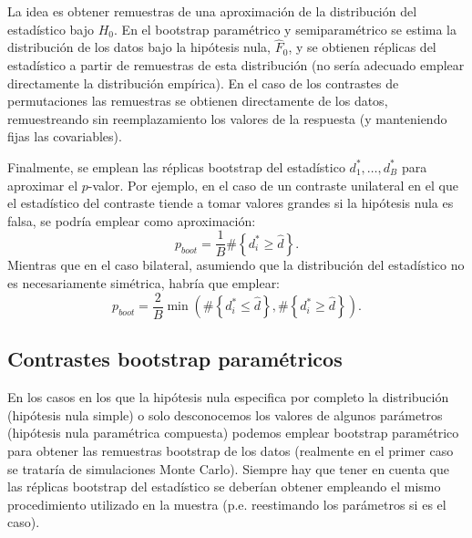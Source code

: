 \documentclass[
  spanish,
  10pt,
]{book}
\theoremstyle{break}
\theoremstyle{nonumberplain}
\begin{document}
La idea es obtener remuestras de una aproximación de la distribución del
estadístico bajo \(H_0\).
En el bootstrap paramétrico y semiparamétrico se estima la distribución
de los datos bajo la hipótesis nula, \(\hat{F}_0\), y se obtienen réplicas del
estadístico a partir de remuestras de esta distribución (no sería adecuado
emplear directamente la distribución empírica).
En el caso de los contrastes de permutaciones las remuestras se obtienen
directamente de los datos, remuestreando sin reemplazamiento los valores
de la respuesta (y manteniendo fijas las covariables).

Finalmente, se emplean las réplicas bootstrap
del estadístico \(d_1^{\ast},\ldots, d_B^{\ast}\) para aproximar el \(p\)-valor.
Por ejemplo, en el caso de un contraste unilateral en el que el estadístico del
contraste tiende a tomar valores grandes si la hipótesis nula es falsa,
se podría emplear como aproximación:
\[p_{boot} = \frac{1}{B}\#\left\{ d_i^{\ast} \geq \hat{d} \right\}.\]
Mientras que en el caso bilateral, asumiendo que la distribución del estadístico
no es necesariamente simétrica, habría que emplear:
\[p_{boot} = \frac{2}{B} \min \left(\#\left\{ d_i^{\ast} \leq \hat{d} \right\},
\#\left\{ d_i^{\ast} \geq \hat{d} \right\}\right).\]

\subsection{Contrastes bootstrap paramétricos}\label{contrastes-parametricos}

En los casos en los que la hipótesis nula especifica por completo la distribución
(hipótesis nula simple) o solo desconocemos los valores de algunos parámetros
(hipótesis nula paramétrica compuesta) podemos emplear
bootstrap paramétrico para obtener las remuestras bootstrap de los datos
(realmente en el primer caso se trataría de simulaciones Monte Carlo).
Siempre hay que tener en cuenta que las réplicas bootstrap del estadístico se
deberían obtener empleando el mismo procedimiento utilizado en la muestra
(p.e. reestimando los parámetros si es el caso).
\end{document}
